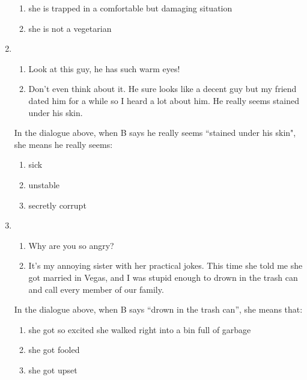 \documentclass[output=paper]{langsci/langscibook}
\begin{document}
\begin{enumerate}
\begin{enumerate}[label=\arabic*.,noitemsep]
        \item she is trapped in a comfortable but damaging situation
        \item she is not a vegetarian
        \end{enumerate}
    \item
       \begin{enumerate}[nosep,label=\Alph*:]
        \item Look at this guy, he has such warm eyes!
        \item Don't even think about it. He sure looks like a decent guy but my friend dated him for a while so I heard a lot about him. He really seems stained under his skin.
        \end{enumerate}
        In the dialogue above, when B says he really seems “stained under his skin", she means he really seems:
        \begin{enumerate}[label=\arabic*.,noitemsep]
        \item sick
        \item unstable
        \item secretly corrupt
        \end{enumerate}
    \item
       \begin{enumerate}[nosep,label=\Alph*:]
        \item Why are you so angry?
        \item It's my annoying sister with her practical jokes. This time she told me she got married in Vegas, and I was stupid enough to drown in the trash can and call every member of our family.
        \end{enumerate}
        In the dialogue above, when B says \enquote{drown in the trash can}, she means that:
        \begin{enumerate}[label=\arabic*.,noitemsep]
        \item she got so excited she walked right into a bin full of garbage
        \item she got  fooled
        \item she got upset
        \end{enumerate}
\end{enumerate}

\end{document}
